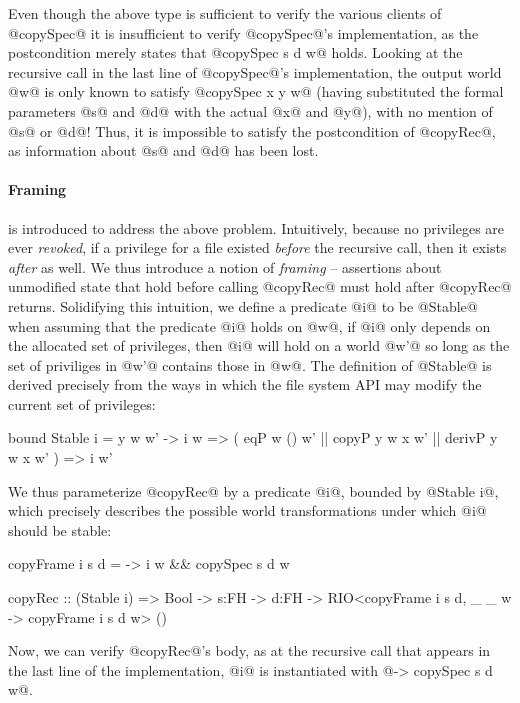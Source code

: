 Even though the above type is sufficient to verify
the various clients of @copySpec@ it
is insufficient to verify @copySpec@'s implementation, 
as the postcondition merely states that @copySpec s d w@ holds.
%
Looking at the recursive call in the last line of @copySpec@'s implementation,
the output world @w@ is only known to satisfy @copySpec x y w@ (having
substituted the formal parameters @s@ and @d@ with the actual @x@ and
@y@), with no mention of @s@ or @d@!
%
Thus, it is impossible to satisfy the postcondition of @copyRec@, as
information about @s@ and @d@ has been lost.

\paragraph{Framing} is introduced to address the above problem.
Intuitively, because no privileges are ever
\emph{revoked}, if a privilege for a file existed \emph{before} the
recursive call, then it exists \emph{after} as well.
%
We thus introduce a notion of \emph{framing} -- assertions about
unmodified state that hold before calling @copyRec@ must hold after
@copyRec@ returns.
%
Solidifying this intuition, we define a predicate @i@ to be @Stable@
when assuming that the predicate @i@
holds on @w@, if @i@ only depends on the allocated set of 
privileges, then @i@ will hold on a world @w'@ so long as
the set of priviliges in @w'@ contains those in @w@.
%
The definition of @Stable@ is derived precisely from the ways in which
the file system API may modify the current set of privileges:
%
\begin{code}
  bound Stable i = \x y w w' -> 
   i w => ( eqP w () w' || copyP y w x w'
           || derivP y w x w'
          ) => i w'
\end{code}
%
We thus parameterize @copyRec@ by a predicate @i@, bounded by @Stable i@, 
which precisely describes the possible world transformations under which 
@i@ should be stable:
%
\begin{code}
  copyFrame i s d = \w -> i w && copySpec s d w

  copyRec :: (Stable i) => 
             Bool -> s:FH -> d:FH ->
             RIO<copyFrame i s d,
                 \_ _ w -> copyFrame i s d w> () 
\end{code}              
%
Now, we can verify @copyRec@'s body, as
at the recursive call that appears in the last line of the implementation,
@i@ is instantiated with 
%
@\w -> copySpec s d w@.

